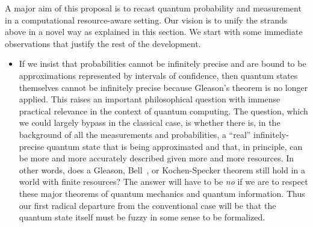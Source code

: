 \documentclass{article}
\theoremstyle{remark}
\begin{document}
A major aim of this proposal is to recast quantum probability and
measurement in a computational resource-aware setting. Our vision is
to unify the strands above in a novel way as explained in this
section. We start with some immediate observations that justify the
rest of the development. 

\begin{itemize}

\item If we insist that probabilities cannot be infinitely precise and
  are bound to be approximations represented by intervals of
  confidence, then quantum states themselves cannot be infinitely precise
  because Gleason's theorem is no longer applied. 
  This raises an important philosophical
  question with immense practical relevance in the context of quantum
  computing. The question, which we could largely bypass in the
  classical case, is whether there is, in the background of all the
  measurements and probabilities, a ``real'' infinitely-precise
  quantum state that is being approximated and that, in principle, can
  be more and more accurately described given more and more
  resources. In other words, does a Gleason,
  Bell~\cite{BellBook1987,Redhead1987-REDINA,peres1995quantum,Jaeger2007}, 
  or Kochen-Specker
  theorem still hold in a world with finite resources?  The answer
  will have to be \emph{no} if we are to respect these major theorems
  of quantum mechanics and quantum information. Thus our first radical
  departure from the conventional case will be that the quantum state
  itself must be fuzzy in some sense to be formalized.


\end{itemize}
\end{document}
